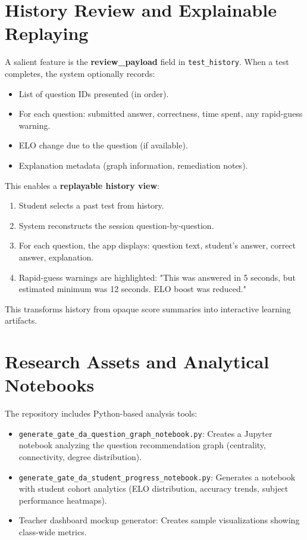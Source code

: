 \documentclass[sigconf,authordraft,twoside]{acmart}
\newcommand{\tech}[1]{\textcolor{brandblue}{\nolinkurl{#1}}}
\begin{document}
\section{History Review and Explainable Replaying}

A salient feature is the \textbf{review\_payload} field in \tech{test\_history}. When a test completes, the system optionally records:

\begin{itemize}
\item List of question IDs presented (in order).
\item For each question: submitted answer, correctness, time spent, any rapid-guess warning.
\item ELO change due to the question (if available).
\item Explanation metadata (graph information, remediation notes).
\end{itemize}

This enables a \textbf{replayable history view}:

\begin{enumerate}
\item Student selects a past test from history.
\item System reconstructs the session question-by-question.
\item For each question, the app displays: question text, student's answer, correct answer, explanation.
\item Rapid-guess warnings are highlighted: "This was answered in 5 seconds, but estimated minimum was 12 seconds. ELO boost was reduced."
\end{enumerate}

This transforms history from opaque score summaries into interactive learning artifacts.

\section{Research Assets and Analytical Notebooks}

The repository includes Python-based analysis tools:

\begin{itemize}
\item \tech{generate\_gate\_da\_question\_graph\_notebook.py}: Creates a Jupyter notebook analyzing the question recommendation graph (centrality, connectivity, degree distribution).

\item \tech{generate\_gate\_da\_student\_progress\_notebook.py}: Generates a notebook with student cohort analytics (ELO distribution, accuracy trends, subject performance heatmaps).

\item Teacher dashboard mockup generator: Creates sample visualizations showing class-wide metrics.
\end{itemize}
\end{document}
